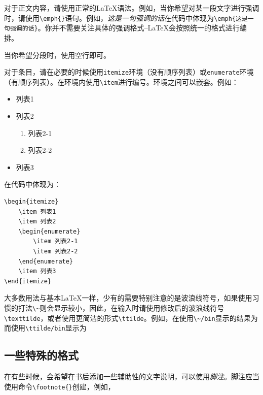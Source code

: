 对于正文内容，请使用正常的\LaTeX 语法。例如，当你希望对某一段文字进行强调时，请使用\verb|\emph{}|语句。例如，\emph{这是一句强调的话}在代码中体现为\verb|\emph{这是一句强调的话}|。你并不需要关注具体的强调格式--\LaTeX 会按照统一的格式进行编排。

当你希望分段时，使用空行即可。

对于条目，请在必要的时候使用\verb|itemize|环境（没有顺序列表）或\verb|enumerate|环境（有顺序列表）。在环境内使用\verb|\item|进行编号。环境之间可以嵌套。例如：

\begin{itemize}
    \item 列表1
    \item 列表2
    \begin{enumerate}
        \item 列表2-1
        \item 列表2-2
    \end{enumerate}
    \item 列表3
\end{itemize}

在代码中体现为：

\begin{lstlisting}[frame=line]
\begin{itemize}
    \item 列表1
    \item 列表2
    \begin{enumerate}
        \item 列表2-1
        \item 列表2-2
    \end{enumerate}
    \item 列表3
\end{itemize}
\end{lstlisting}

大多数用法与基本\LaTeX 一样，少有的需要特别注意的是波浪线符号\texttilde，如果使用习惯的打法\verb|\~|则会显示较小，因此，在输入时请使用修改后的波浪线符号\verb|\texttilde|，或者使用更简洁的形式\verb|\ttilde|。例如，在使用\verb|\~/bin|显示的结果为而使用\verb|\ttilde/bin|显示为

\subsection{一些特殊的格式}\label{subsec:关于如何使用LaTeX编写模板-一些特殊的格式}

在有些时候，会希望在书后添加一些辅助性的文字说明，可以使用\emph{脚注}。脚注应当使用命令\verb|\footnote{}|创建，例如，

